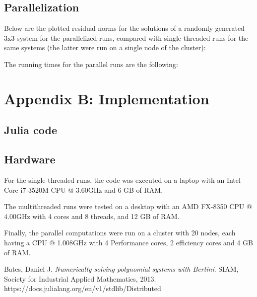 \documentclass[a4paper]{article}
\theoremstyle{definition}
\theoremstyle{definition}
\theoremstyle{remark}
\theoremstyle{definition}
\begin{document}
\restoregeometry

\subsection{Parallelization}

Below are the plotted residual norms for the solutions of a randomly generated 3x3 system for the parallelized runs, compared with single-threaded runs for the same systems (the
latter were run on a single node of the cluster):

The running times for the parallel runs are the following:

\section{Appendix B: Implementation}
\subsection{Julia code}
\label{sec:listing}
\label{sec:random}
\subsection{Hardware}\label{sec:hw}
For the single-threaded runs, the code was executed on a laptop with an Intel Core i7-3520M CPU @ 3.60GHz and 6 GB of RAM.

The multithreaded runs were tested on a desktop with an AMD FX-8350 CPU @ 4.00GHz with 4 cores and 8 threads, and 12 GB of RAM.

Finally, the parallel computations were run on a cluster with 20 nodes, each having a CPU @ 1.008GHz with 4 Performance cores, 2 efficiency cores and 4 GB of RAM.

 Bates, Daniel J. \textit{Numerically solving polynomial systems with Bertini}. SIAM, Society for Industrial Applied Mathematics, 2013.
 https://docs.julialang.org/en/v1/stdlib/Distributed
\end{document}
